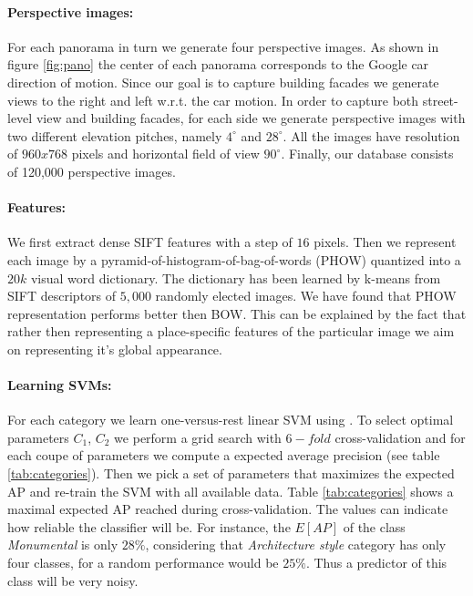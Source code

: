 \documentclass[runningheads, table]{llncs}
\begin{document}
  \paragraph{Perspective images:}
  For each panorama in turn we generate four perspective images. As shown in figure \ref{fig:pano} the center of each panorama corresponds to the Google car direction of motion. Since our goal is to capture building facades we generate views to the right and left w.r.t. the car motion. In order to capture both street-level view and building facades, for each side we generate perspective images with two different elevation pitches, namely $4^\circ$ and $28^\circ$. All the images have resolution of $960x768$ pixels and horizontal field of view $90^\circ$. Finally, our database consists of 120,000 perspective images.

  \paragraph{Features:}
  We first extract dense SIFT features with a step of $16$ pixels. Then we represent each image by a pyramid-of-histogram-of-bag-of-words (PHOW) \cite{} quantized into a $20k$ visual word dictionary. The dictionary has been learned by k-means from SIFT descriptors of $5,000$ randomly elected images. We have found that PHOW representation performs better then BOW. This can be explained by the fact that rather then representing a place-specific features of the particular image we aim on representing it's global appearance.

  \paragraph{Learning SVMs:}
  For each category we learn one-versus-rest linear SVM using \cite{liblinear}. To select optimal parameters $C_1$, $C_2$ we perform a grid search with $6-fold$ cross-validation and for each coupe of parameters we compute a expected average precision (see table \ref{tab:categories}). Then we pick a set of parameters that maximizes the expected AP and re-train the SVM with all available data. Table \ref{tab:categories} shows a maximal expected AP reached during cross-validation. The values can indicate how reliable the classifier will be. For instance, the $E[AP]$ of the class \emph{Monumental} is only $28\%$, considering that \emph{Architecture style} category has only four classes, for a random performance would be $25\%$. Thus a predictor of this class will be very noisy.
\end{document}
